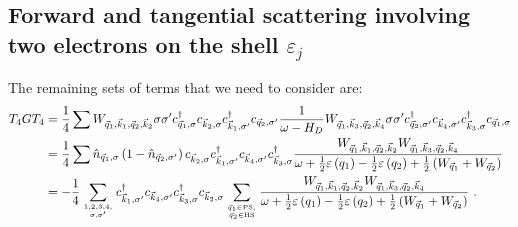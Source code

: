 \documentclass{revtex4-2}
\begin{document}
\subsection{Forward and tangential scattering involving two electrons on the shell \(\varepsilon_j\)}
The remaining sets of terms that we need to consider are:
\begin{equation}\begin{aligned}
	T_4 G T_4 &= \frac{1}{4}\sum  W_{\vec q_1,\vec k_1, \vec q_2, \vec k_2} \sigma\sigma^\prime c^\dagger_{\vec q_1,\sigma}c_{\vec k_2,\sigma}c^\dagger_{\vec k_1,\sigma^\prime}c_{\vec q_2,\sigma^\prime} \frac{1}{\omega - H_D}W_{\vec q_1, \vec k_3, \vec q_2, \vec k_4} \sigma\sigma^\prime c^\dagger_{\vec q_2,\sigma^\prime}c_{\vec k_4,\sigma^\prime}c^\dagger_{\vec k_3,\sigma}c_{\vec q_1,\sigma}\\
		  &= \frac{1}{4}\sum \hat n_{\vec q_1,\sigma} \left(1 - \hat n_{\vec q_2,\sigma^\prime}\right) c_{\vec k_2,\sigma}c^\dagger_{\vec k_1,\sigma^\prime}c_{\vec k_4,\sigma^\prime}c^\dagger_{\vec k_3,\sigma} \frac{W_{\vec q_1,\vec k_1, \vec q_2, \vec k_2} W_{\vec q_1, \vec k_3, \vec q_2, \vec k_4}}{\omega + \frac{1}{2}\varepsilon\left(q_1\right) - \frac{1}{2}\varepsilon\left(q_2\right) + \frac{1}{2}\left(W_{\vec q_1} + W_{\vec q_2}\right)}  \\
		  &= -\frac{1}{4}\sum_{1,2,3,4,\atop{\sigma,\sigma^\prime}} c^\dagger_{\vec k_1,\sigma^\prime}c_{\vec k_4,\sigma^\prime}c^\dagger_{\vec k_3,\sigma}c_{\vec k_2,\sigma} \sum_{\vec q_1 \in \text{PS}, \atop{\vec q_2 \in \text{HS}}}\frac{W_{\vec q_1,\vec k_1, \vec q_2, \vec k_2} W_{\vec q_1, \vec k_3, \vec q_2, \vec k_4}}{\omega + \frac{1}{2}\varepsilon\left(q_1\right) - \frac{1}{2}\varepsilon\left(q_2\right) + \frac{1}{2}\left(W_{\vec q_1} + W_{\vec q_2}\right)}~.
\end{aligned}\end{equation}
\end{document}
